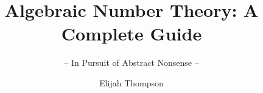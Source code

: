 \documentclass[graybox,envcountchap,sectrefs]{style/svmono}
\begin{document}
\author{Elijah Thompson}
\title{Algebraic Number Theory: A Complete Guide}
\subtitle{-- In Pursuit of Abstract Nonsense --}
\maketitle

\frontmatter%

%
%

%

\tableofcontents

%


\mainmatter%




\backmatter%
%
%
%
\printindex

\end{document}

